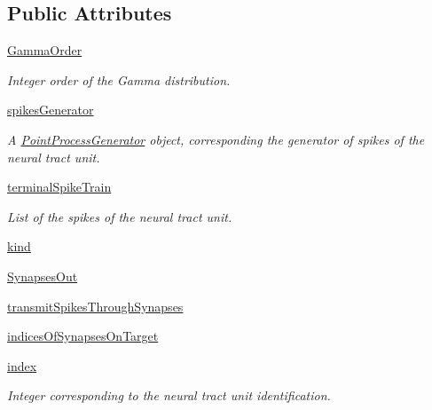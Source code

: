 \subsection*{Public Attributes}
\begin{DoxyCompactItemize}
\item 
\hyperlink{class_neural_tract_unit_1_1_neural_tract_unit_aee01a134ce97127783d75757ec15f352}{Gamma\+Order}
\begin{DoxyCompactList}\small\item\em Integer order of the Gamma distribution. \end{DoxyCompactList}\item 
\hyperlink{class_neural_tract_unit_1_1_neural_tract_unit_a57cbb130e004fb3f7ee8d8a540f7dff0}{spikes\+Generator}
\begin{DoxyCompactList}\small\item\em A \hyperlink{namespace_point_process_generator}{Point\+Process\+Generator} object, corresponding the generator of spikes of the neural tract unit. \end{DoxyCompactList}\item 
\hyperlink{class_neural_tract_unit_1_1_neural_tract_unit_ac34c86235329e753e8cfdfcc1e24c53f}{terminal\+Spike\+Train}
\begin{DoxyCompactList}\small\item\em List of the spikes of the neural tract unit. \end{DoxyCompactList}\item 
\hyperlink{class_neural_tract_unit_1_1_neural_tract_unit_a29dce2584fbb4bd98199c05bdc767bf1}{kind}
\item 
\hyperlink{class_neural_tract_unit_1_1_neural_tract_unit_a740d2cfa17ad57c7dbd40fbafc654b95}{Synapses\+Out}
\item 
\hyperlink{class_neural_tract_unit_1_1_neural_tract_unit_ac6fa367f6ada8045919674feaed4f6ad}{transmit\+Spikes\+Through\+Synapses}
\item 
\hyperlink{class_neural_tract_unit_1_1_neural_tract_unit_a4e5fa20e16e924e7f27a087e8f7a19a7}{indices\+Of\+Synapses\+On\+Target}
\item 
\hyperlink{class_neural_tract_unit_1_1_neural_tract_unit_ae98dd2328b661ea541f81a8b4c259557}{index}
\begin{DoxyCompactList}\small\item\em Integer corresponding to the neural tract unit identification. \end{DoxyCompactList}\end{DoxyCompactItemize}


